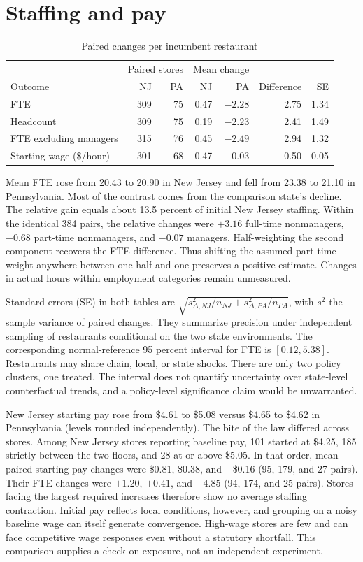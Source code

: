 \documentclass[11pt]{article}
\begin{document}
\section{Staffing and pay}
\begin{table}[ht]
\centering
\caption{Paired changes per incumbent restaurant}
\small
\begin{tabular}{lrrrrrr}
\toprule
& \multicolumn{2}{c}{Paired stores} & \multicolumn{2}{c}{Mean change}
& & \\
Outcome & NJ & PA & NJ & PA & Difference & SE\\
\midrule
FTE &309&75&0.47&$-2.28$&2.75&1.34\\
Headcount &309&75&0.19&$-2.23$&2.41&1.49\\
FTE excluding managers &315&76&0.45&$-2.49$&2.94&1.32\\
Starting wage (\$/hour)&301&68&0.47&$-0.03$&0.50&0.05\\
\bottomrule
\end{tabular}
\end{table}

Mean FTE rose from 20.43 to 20.90 in New Jersey and fell from
23.38 to 21.10 in Pennsylvania. Most of the contrast comes from the
comparison state's decline. The relative gain equals about 13.5 percent
of initial New Jersey staffing. Within the identical 384 pairs, the
relative changes were $+3.16$ full-time nonmanagers, $-0.68$ part-time
nonmanagers, and $-0.07$ managers. Half-weighting the second component
recovers the FTE difference. Thus shifting the assumed part-time weight
anywhere between one-half and one preserves a positive estimate.
Changes in actual hours within employment categories remain unmeasured.

Standard errors (SE) in both tables are
$\sqrt{s^2_{\Delta,NJ}/n_{NJ}+s^2_{\Delta,PA}/n_{PA}}$, with
$s^2$ the sample variance of paired changes. They summarize precision
under independent sampling of restaurants conditional on the two state
environments. The corresponding normal-reference 95 percent interval for
FTE is $[0.12,5.38]$. Restaurants may share chain, local, or state
shocks. There are only two policy clusters, one treated. The interval
does not quantify uncertainty over state-level counterfactual trends,
and a policy-level significance claim would be unwarranted.

New Jersey starting pay rose from \$4.61 to \$5.08 versus \$4.65 to
\$4.62 in Pennsylvania (levels rounded independently). The bite of the
law differed across stores. Among New Jersey stores reporting baseline
pay, 101 started at \$4.25, 185 strictly between the two floors, and 28
at or above \$5.05. In that order, mean paired starting-pay changes were
\$0.81, \$0.38, and $-$\$0.16 (95, 179, and 27 pairs). Their FTE changes
were $+1.20$, $+0.41$, and $-4.85$ (94, 174, and 25 pairs).
Stores facing the largest required increases therefore show no average
staffing contraction. Initial pay reflects local conditions, however,
and grouping on a noisy baseline wage can itself generate convergence.
High-wage stores are few and can face competitive wage responses even
without a statutory shortfall. This comparison supplies a check on
exposure, not an independent experiment.
\end{document}
